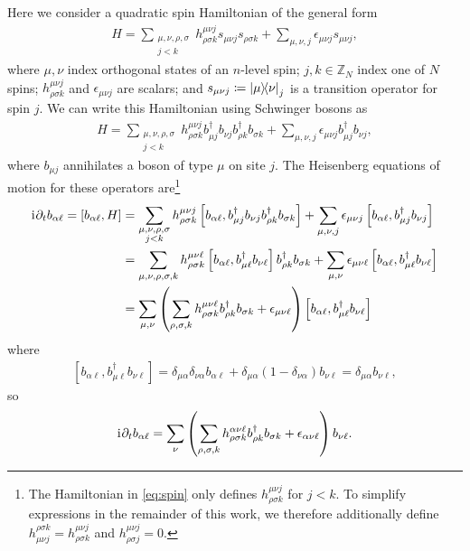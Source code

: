 \documentclass[nofootinbib,notitlepage,11pt]{revtex4-2}
\newcommand{\p}[1]{\left(#1\right)} %
\renewcommand{\sp}[1]{\left[#1\right]} %
\renewcommand{\d}{\partial} %
\renewcommand{\i}{\mathrm{i}\mkern1mu} %
\newcommand{\1}{\mathds{1}}
\newcommand{\ZZ}{\mathbb{Z}}
\begin{document}
Here we consider a quadratic spin Hamiltonian of the general form
\begin{align}
  H = \sum_{\substack{\mu,\nu,\rho,\sigma\\j<k}}
  h^{\mu\nu j}_{\rho\sigma k} s_{\mu\nu j} s_{\rho\sigma k}
  + \sum_{\mu,\nu,j} \epsilon_{\mu\nu j} s_{\mu\nu j},
  \label{eq:spin}
\end{align}
where $\mu,\nu$ index orthogonal states of an $n$-level spin; $j,k\in\ZZ_N$ index one of $N$ spins; $h^{\mu\nu j}_{\rho\sigma k}$ and $\epsilon_{\mu\nu j}$ are scalars; and $s_{\mu\nu j}\coloneqq\op{\mu}{\nu}_j$ is a transition operator for spin $j$.  We can write this Hamiltonian using Schwinger bosons as
\begin{align}
  H = \sum_{\substack{\mu,\nu,\rho,\sigma\\j<k}}
  h^{\mu\nu j}_{\rho\sigma k}
  b_{\mu j}^\dag b_{\nu j} b_{\rho k}^\dag b_{\sigma k}
  + \sum_{\mu,\nu,j} \epsilon_{\mu\nu j} b_{\mu j}^\dag b_{\nu j},
\end{align}
where $b_{\mu j}$ annihilates a boson of type $\mu$ on site $j$.
The Heisenberg equations of motion for these operators are\footnote{The Hamiltonian in \eqref{eq:spin} only defines $h^{\mu\nu j}_{\rho\sigma k}$ for $j<k$.
  To simplify expressions in the remainder of this work, we therefore additionally define $h^{\rho\sigma k}_{\mu\nu j}=h^{\mu\nu j}_{\rho\sigma k}$ and $h^{\mu\nu j}_{\rho\sigma j}=0$.}
\begin{align}
  \i \d_t b_{\alpha\ell} = \sp{b_{\alpha\ell}, H}
  &= \sum_{\substack{\mu,\nu,\rho,\sigma\\j<k}}
  h^{\mu\nu j}_{\rho\sigma k}
  \sp{b_{\alpha\ell}, b_{\mu j}^\dag b_{\nu j} b_{\rho k}^\dag b_{\sigma k}}
  + \sum_{\mu,\nu,j} \epsilon_{\mu\nu j}
  \sp{b_{\alpha\ell}, b_{\mu j}^\dag b_{\nu j}} \\
  &= \sum_{\mu,\nu,\rho,\sigma,k} h^{\mu\nu\ell}_{\rho\sigma k}
  \sp{b_{\alpha\ell}, b_{\mu\ell}^\dag b_{\nu\ell}}
  b_{\rho k}^\dag b_{\sigma k}
  + \sum_{\mu,\nu} \epsilon_{\mu\nu\ell}
  \sp{b_{\alpha\ell}, b_{\mu\ell}^\dag b_{\nu\ell}} \\
  &= \sum_{\mu,\nu} \p{\sum_{\rho,\sigma,k}
    h^{\mu\nu\ell}_{\rho\sigma k} b_{\rho k}^\dag b_{\sigma k}
    + \epsilon_{\mu\nu\ell}}
  \sp{b_{\alpha\ell}, b_{\mu\ell}^\dag b_{\nu\ell}}
\end{align}
where
\begin{align}
  \sp{b_{\alpha\ell}, b_{\mu\ell}^\dag b_{\nu\ell}}
  = \delta_{\mu\alpha} \delta_{\nu\alpha} b_{\alpha\ell}
  + \delta_{\mu\alpha} \p{1-\delta_{\nu\alpha}} b_{\nu\ell}
  = \delta_{\mu\alpha} b_{\nu\ell},
\end{align}
so
\begin{align}
  \i \d_t b_{\alpha\ell}
  = \sum_\nu \p{\sum_{\rho,\sigma,k}
    h^{\alpha\nu\ell}_{\rho\sigma k} b_{\rho k}^\dag b_{\sigma k}
    + \epsilon_{\alpha\nu\ell}} b_{\nu\ell}.
\end{align}


\end{document}
